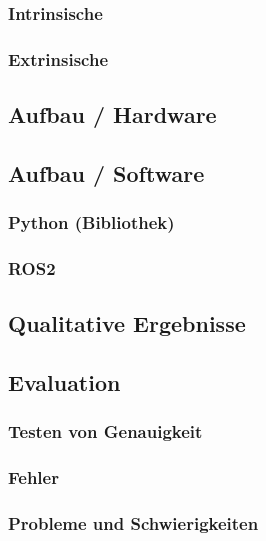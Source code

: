 		\subsubsection{Intrinsische}
		\subsubsection{Extrinsische}
		
	\subsection{Aufbau / Hardware}
	
	\subsection{Aufbau / Software}
		\subsubsection{Python (Bibliothek)}
		\subsubsection{ROS2}
		
	\subsection{Qualitative Ergebnisse}
	
	\subsection{Evaluation}
		\subsubsection{Testen von Genauigkeit}
		\subsubsection{Fehler}
		\subsubsection{Probleme und Schwierigkeiten}